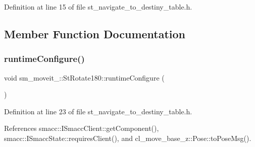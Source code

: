 Definition at line 15 of file st\+\_\+navigate\+\_\+to\+\_\+destiny\+\_\+table.\+h.



\subsection{Member Function Documentation}
\mbox{\label{structsm__moveit__4_1_1StRotate180_ae75dd5d227f546702062f89c9cada37b}} 
\subsubsection{\texorpdfstring{runtime\+Configure()}{runtimeConfigure()}}
{\footnotesize\ttfamily void sm\+\_\+moveit\+\_\+::\+St\+Rotate180\+::runtime\+Configure (\begin{DoxyParamCaption}{ }\end{DoxyParamCaption})\hspace{0.3cm}{\ttfamily [inline]}}



Definition at line 23 of file st\+\_\+navigate\+\_\+to\+\_\+destiny\+\_\+table.\+h.



References smacc\+::\+I\+Smacc\+Client\+::get\+Component(), smacc\+::\+I\+Smacc\+State\+::requires\+Client(), and cl\+\_\+move\+\_\+base\+\_\+z\+::\+Pose\+::to\+Pose\+Msg().


